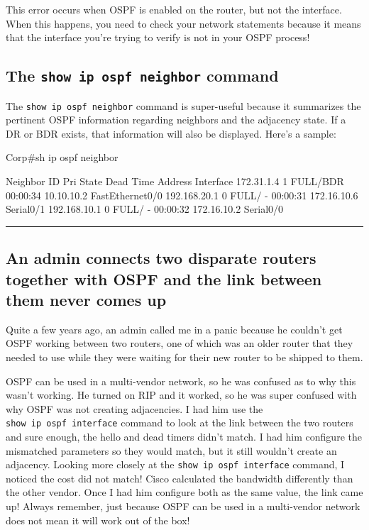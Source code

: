 This error occurs when OSPF is enabled on the router, but not the
interface. When this happens, you need to check your network statements
because it means that the interface you're trying to verify is not in
your OSPF process!

\subsection{The \texttt{show ip ospf neighbor} command}

The \texttt{show\ ip\ ospf\ neighbor} command is super-useful because it
summarizes the pertinent OSPF information regarding neighbors and the
adjacency state. If a DR or BDR exists, that information will also be
displayed. Here's a sample:

\begin{cli}
Corp#sh ip ospf neighbor

Neighbor ID     Pri   State      Dead Time   Address         Interface
172.31.1.4        1   FULL/BDR   00:00:34    10.10.10.2     FastEthernet0/0
192.168.20.1      0   FULL/  -   00:00:31    172.16.10.6     Serial0/1
192.168.10.1      0   FULL/  -   00:00:32    172.16.10.2     Serial0/0
\end{cli}

\begin{center}\rule{0.5\linewidth}{0.5pt}\end{center}


\subsection{An admin connects two disparate routers together with OSPF and the link between them never comes up}

Quite a few years ago, an admin called me in a panic because he couldn't
get OSPF working between two routers, one of which was an older router
that they needed to use while they were waiting for their new router to
be shipped to them.

OSPF can be used in a multi-vendor network, so he was confused as to why
this wasn't working. He turned on RIP and it worked, so he was super
confused with why OSPF was not creating adjacencies.
I had him use the \texttt{show\ ip\ ospf\ interface}
command to look at the link between the two routers and sure enough, the
hello and dead timers didn't match. I had him configure the mismatched
parameters so they would match, but it still wouldn't create an
adjacency. Looking more closely at the
\texttt{show\ ip\ ospf\ interface} command, I noticed the cost did not
match! Cisco calculated the bandwidth differently than the other vendor.
Once I had him configure both as the same value, the link came up!
Always remember, just because OSPF can be used in a multi-vendor network
does not mean it will work out of the box!

